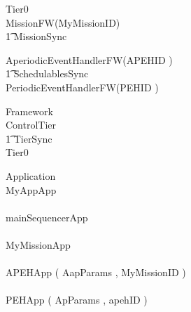 \begin{circus}
\circprocess Tier0 \circdef \\

\circblockopen
	MissionFW(MyMissionID)\\
		\t1 	\lpar MissionSync \rpar \\
		\circblockopen










			AperiodicEventHandlerFW(APEHID )\\

\t1 \lpar SchedulablesSync \rpar\\



			PeriodicEventHandlerFW(PEHID )\\
		\circblockclose
\circblockclose
\end{circus}
%
%
%
\begin{circus}
\circprocess Framework \circdef \\
\circblockopen
ControlTier \\
\t1 \lpar TierSync \rpar \\
 \circblockopen
Tier0
\circblockclose
\circblockclose
\end{circus}
%
%
\begin{circus}
\circprocess  Application \circdef \\
\circblockopen
MyAppApp\\
\interleave\\
mainSequencerApp\\
\interleave \\
		MyMissionApp\\
		\interleave \\
			APEHApp ( AapParams ,  MyMissionID  ) \\
			\interleave \\
			PEHApp ( ApParams ,  apehID  ) \\
			
		
\circblockclose
\end{circus}
